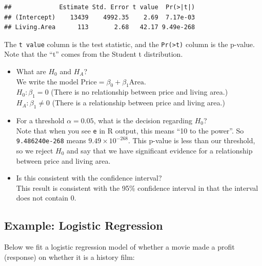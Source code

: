 \documentclass[]{book}
\newenvironment{Shaded}{\begin{snugshade}}{\end{snugshade}}
\newcommand{\CommentTok}[1]{\textcolor[rgb]{0.56,0.35,0.01}{\textit{#1}}}
\newcommand{\DataTypeTok}[1]{\textcolor[rgb]{0.13,0.29,0.53}{#1}}
\newcommand{\KeywordTok}[1]{\textcolor[rgb]{0.13,0.29,0.53}{\textbf{#1}}}
\newcommand{\NormalTok}[1]{#1}
\newcommand{\OperatorTok}[1]{\textcolor[rgb]{0.81,0.36,0.00}{\textbf{#1}}}
\newcommand{\OtherTok}[1]{\textcolor[rgb]{0.56,0.35,0.01}{#1}}
\newcommand{\StringTok}[1]{\textcolor[rgb]{0.31,0.60,0.02}{#1}}
\providecommand{\tightlist}{%
  \setlength{\itemsep}{0pt}\setlength{\parskip}{0pt}}
\begin{document}
\begin{verbatim}
##             Estimate Std. Error t value  Pr(>|t|)
## (Intercept)    13439    4992.35    2.69  7.17e-03
## Living.Area      113       2.68   42.17 9.49e-268
\end{verbatim}

The \texttt{t\ value} column is the test statistic, and the \texttt{Pr(\textgreater{}\textbar{}t\textbar{})} column is the p-value. Note that the ``t'' comes from the Student t distribution.

\begin{itemize}
\tightlist
\item
  What are \(H_0\) and \(H_A\)?\\
  We write the model \(\text{Price} = \beta_0 + \beta_1\text{Area}\).\\
  \(H_0: \beta_1 = 0\) (There is no relationship between price and living area.)\\
  \(H_A: \beta_1 \neq 0\) (There is a relationship between price and living area.)\\
\item
  For a threshold \(\alpha = 0.05\), what is the decision regarding \(H_0\)?\\
  Note that when you see \texttt{e} in R output, this means ``10 to the power''. So \texttt{9.486240e-268} means \(9.49 \times 10^{-268}\). This p-value is less than our threshold, so we reject \(H_0\) and say that we have significant evidence for a relationship between price and living area.
\item
  Is this consistent with the confidence interval?\\
  This result is consistent with the 95\% confidence interval in that the interval does not contain 0.
\end{itemize}

\hypertarget{example-logistic-regression}{%
\subsection{Example: Logistic Regression}\label{example-logistic-regression}}

Below we fit a logistic regression model of whether a movie made a profit (response) on whether it is a history film:

\begin{Shaded}
\end{Shaded}
\end{document}
